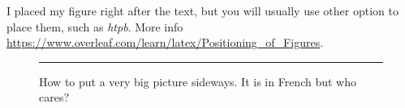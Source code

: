 \documentclass[../Thesis]{subfiles}
\begin{document}
I placed my figure right after the text, but you will usually use other option to place them, such as \textit{htpb}. More info \url{https://www.overleaf.com/learn/latex/Positioning_of_Figures}. 

\begin{figure}[H] 
    \centering 
    \rule{35em}{0.5pt} 
    \caption[Sideways picture]{How to put a very big picture sideways. It is in French but who cares?} 
    \label{fig:veryBigFigure} 
\end{figure}
\end{document}
